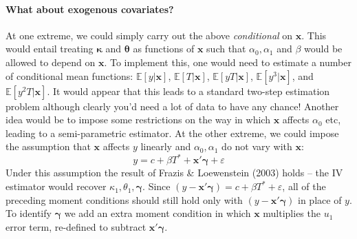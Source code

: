 \documentclass[12pt]{article}
\begin{document}
\paragraph{What about exogenous covariates?}
At one extreme, we could simply carry out the above \emph{conditional} on $\mathbf{x}$.
This would entail treating $\boldsymbol{\kappa}$ and $\boldsymbol{\theta}$ as functions of $\mathbf{x}$ such that $\alpha_0, \alpha_1$ and $\beta$ would be allowed to depend on $\mathbf{x}$.
To implement this, one would need to estimate a number of conditional mean functions: $\mathbb{E}[y|\mathbf{x}]$, $\mathbb{E}[T|\mathbf{x}]$, $\mathbb{E}[yT|\mathbf{x}]$, $\mathbb{E}[y^3|\mathbf{x}]$, and $\mathbb{E}[y^2T|\mathbf{x}]$.
It would appear that this leads to a standard two-step estimation problem although clearly you'd need a lot of data to have any chance!
Another idea would be to impose some restrictions on the way in which $\mathbf{x}$ affects $\alpha_0$ etc, leading to a semi-parametric estimator.
At the other extreme, we could impose the assumption that $\mathbf{x}$ affects $y$ linearly and $\alpha_0, \alpha_1$ do not vary with $\mathbf{x}$:
\[
  y = c + \beta T^* + \mathbf{x}'\boldsymbol{\gamma} + \varepsilon
\]
Under this assumption the result of Frazis \& Loewenstein (2003) holds -- the IV estimator would recover $\kappa_1, \theta_1, \boldsymbol{\gamma}$.
Since $(y - \mathbf{x}'\boldsymbol{\gamma} ) = c + \beta T^* + \varepsilon$, all of the preceding moment conditions should still hold only with $(y - \mathbf{x}'\boldsymbol{\gamma})$ in place of $y$.
To identify $\boldsymbol{\gamma}$ we add an extra moment condition in which $\mathbf{x}$ multiplies the $u_1$ error term, re-defined to subtract $\mathbf{x}'\boldsymbol{\gamma}$.
\end{document}
